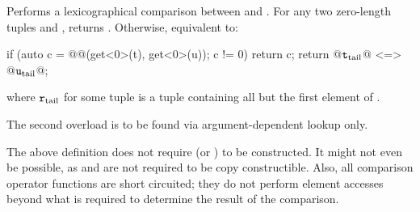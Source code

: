 \documentclass{wg21}
\begin{document}
\begin{itemdescr}
    \pnum
    \effects
    Performs a lexicographical comparison between  and .
    For any two zero-length tuples  and ,
     returns .
    Otherwise, equivalent to:
    \begin{codeblock}
        if (auto c = @@(get<0>(t), get<0>(u)); c != 0) return c;
        return @$\texttt{t}_\mathrm{tail}$@ <=> @$\texttt{u}_\mathrm{tail}$@;
    \end{codeblock}
    where $\texttt{r}_\mathrm{tail}$ for some tuple 
    is a tuple containing all but the first element of .

    \begin{addedblock}
        \remarks The second overload is to be found via argument-dependent lookup only.
    \end{addedblock}
\end{itemdescr}

\pnum
\begin{note}
    The above definition does not require 
    (or ) to be constructed. It might not
    even be possible, as  and  are not required to be copy
    constructible. Also, all comparison operator functions are short circuited;
    they do not perform element accesses beyond what is required to determine the
    result of the comparison.
\end{note}
\end{document}
